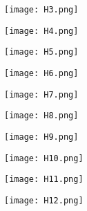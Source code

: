 \documentclass{article}
\begin{document}
\begin{figure}[!hb]
\centering
\texttt{[image:  H3.png]}
\end{figure}

\begin{figure}[!hb]
\centering
\texttt{[image:  H4.png]}
\end{figure}

\begin{figure}[!hb]
\centering
\texttt{[image:  H5.png]}
\end{figure}

\begin{figure}[!hb]
\centering
\texttt{[image:  H6.png]}
\end{figure}

\begin{figure}[!hb]
\centering
\texttt{[image:  H7.png]}
\end{figure}

\begin{figure}[!hb]
\centering
\texttt{[image:  H8.png]}
\end{figure}

\begin{figure}[!hb]
\centering
\texttt{[image:  H9.png]}
\end{figure}

\begin{figure}[!hb]
\centering
\texttt{[image:  H10.png]}
\end{figure}

\begin{figure}[!hb]
\centering
\texttt{[image:  H11.png]}
\end{figure}

\begin{figure}[!hb]
\centering
\texttt{[image:  H12.png]}
\end{figure}
\end{document}
